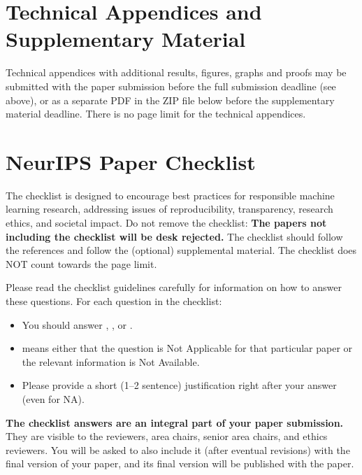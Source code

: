 \documentclass{article}
\begin{document}
\appendix

\section{Technical Appendices and Supplementary Material}
Technical appendices with additional results, figures, graphs and proofs may be submitted with the paper submission before the full submission deadline (see above), or as a separate PDF in the ZIP file below before the supplementary material deadline. There is no page limit for the technical appendices.


\newpage
\section*{NeurIPS Paper Checklist}

The checklist is designed to encourage best practices for responsible machine learning research, addressing issues of reproducibility, transparency, research ethics, and societal impact. Do not remove the checklist: {\bf The papers not including the checklist will be desk rejected.} The checklist should follow the references and follow the (optional) supplemental material.  The checklist does NOT count towards the page
limit. 

Please read the checklist guidelines carefully for information on how to answer these questions. For each question in the checklist:
\begin{itemize}
    \item You should answer \answerYes{}, \answerNo{}, or \answerNA{}.
    \item \answerNA{} means either that the question is Not Applicable for that particular paper or the relevant information is Not Available.
    \item Please provide a short (1–2 sentence) justification right after your answer (even for NA). 
\end{itemize}

{\bf The checklist answers are an integral part of your paper submission.} They are visible to the reviewers, area chairs, senior area chairs, and ethics reviewers. You will be asked to also include it (after eventual revisions) with the final version of your paper, and its final version will be published with the paper.
\end{document}
